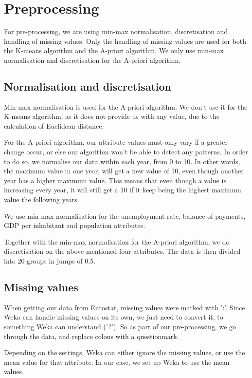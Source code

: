 \chapter{Preprocessing}
\label{PreP}
For pre-processing, we are using min-max normalisation, discretisation and handling of missing values. Only the handling of missing values are used for both the K-means algorithm and the A-priori algorithm. We only use min-max normalisation and discretisation for the A-priori algorithm.

\section{Normalisation and discretisation}
Min-max normalisation is used for the A-priori algorithm. We don't use it for the K-means algorithm, as it does not provide us with any value, due to the calculation of Euclidean distance.

For the A-priori algorithm, our attribute values must only vary if a greater change occur, or else our algorithm won't be able to detect any patterns. In order to do so, we normalise our data within each year, from 0 to 10. In other words, the maximum value in one year, will get a new value of 10, even though another year has a higher maximum value. This means that even though a value is increasing every year, it will still get a 10 if it keep being the highest maximum value the following years.

We use min-max normalisation for the unemployment rate, balance of payments, GDP per inhabitant and population attributes.

Together with the min-max normalisation for the A-priori algorithm, we do discretisation on the above-mentioned four attributes. The data is then divided into 20 groups in jumps of 0.5.

\section{Missing values}
When getting our data from Eurostat, missing values were marked with ':'. Since Weka can handle missing values on its own, we just need to convert it, to something Weka can understand ('?'). So as part of our pre-processing, we go through the data, and replace colons with a questionmark.

Depending on the settings, Weka can either ignore the missing values, or use the mean value for that attribute. In our case, we set up Weka to use the mean values.
